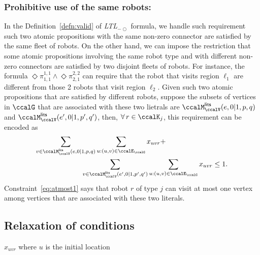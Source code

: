 \documentclass[Afour,sageh,times]{sagej}
\newcommand{\ltl}{ {\it LTL}$_{-\bigcirc}$ }
\renewcommand{\ap}[3]{\mathcal{\pi}_{{#1},{#2}}^{#3}}
\begin{document}
{{\subsubsection{Prohibitive use of the same robots:} In the Definition~\ref{defn:valid} of \ltl formula, we handle such requirement such two atomic propositions with the same non-zero connector are satisfied by the same fleet of robots. On the other hand, we can impose the restriction that some atomic propositions involving the same robot type and with different non-zero connectors are satisfied by two disjoint fleets of robots. For instance, the formula $\Diamond \ap{1}{1}{1,1} \wedge \Diamond \ap{2}{1}{2,2}$ can require that the robot that visits region $\ell_1$ are different from those 2 robots that visit region $\ell_2$. Given such two atomic propositions that are satisfied by different robots, suppose the subsets of vertices in $\ccalG$ that are associated with these two lietrals are $\ccalM_{\ccalV}^\mathsf{lits} (e, 0|1, p, q)$ and $\ccalM_{\ccalV}^\mathsf{lits} (e', 0|1, p', q')$, then, $\forall \, r \in \ccalK_j$, this requirement can be encoded as
\begin{align}\label{eq:atmost1}
  \sum_{v\in \ccalM_{\ccalV}^\mathsf{lits} (e, 0|1, p, q)} & \sum_{u: (u,v) \in \ccalE_\ccalG} x_{uvr} + \nonumber \\
 & \hspace{-2em}  \sum_{v\in \ccalM_{\ccalV}^\mathsf{lits} (e', 0|1, p', q')} \sum_{u: (u,v) \in \ccalE_\ccalG}  x_{uvr} \leq 1.
\end{align}
Constraint~\eqref{eq:atmost1} says that robot $r$ of type $j$ can visit at most one vertex among vertices that are associated with these two literals.


\subsection{Relaxation of conditions}
$x_{uvr}$ where $u$ is the initial location

}}
\end{document}
